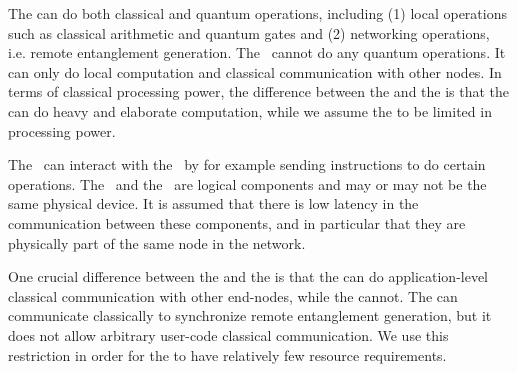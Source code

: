The \QNPU can do both classical and quantum operations, including
    (1) local operations such as classical arithmetic and quantum gates and
    (2) networking operations, i.e. remote entanglement generation.
The \host\ cannot do any quantum operations.
It can only do local computation and classical communication with other nodes.
In terms of classical processing power, the difference between the \host and the \QNPU is that the \host can do heavy and elaborate computation, while we assume the \QNPU to be limited in processing power.

The \host\ can interact with the \QNPU\ by for example sending instructions to do certain operations.
The \host\ and the \QNPU\ are logical components and may or may not be the same physical device.
It is assumed that there is low latency in the communication between these components, and in particular that they are physically part of the same node in the network.

One crucial difference between the \host and the \QNPU is that the \host can do application-level classical communication with other end-nodes, while the \QNPU cannot.
The \QNPU can communicate classically to synchronize remote entanglement generation, but it does not allow arbitrary user-code classical communication.
We use this restriction in order for the \QNPU to have relatively few resource requirements.

